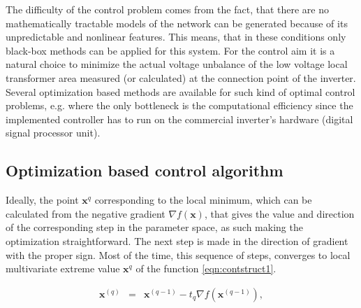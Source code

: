     The difficulty of the control problem comes from the fact, that there are no mathematically tractable models of the network can be generated because of its unpredictable and nonlinear features. This means, that in these conditions only black-box methods can be applied for this system.
    For the control aim it is a natural choice to minimize the actual voltage unbalance of the low voltage local transformer area measured (or calculated) at the connection point of the inverter. Several optimization based methods are available for such kind of optimal control problems, e.g. \cite{gorbe2012reduction} where the only bottleneck is the computational efficiency since the implemented controller has to run on the commercial inverter's hardware (digital signal processor unit).

    \subsection{Optimization based control algorithm}\label{VUB:sec:Optimization}

        Ideally, the point $\textbf{x}^q$ corresponding to the local minimum, which can be calculated from the negative gradient $\nabla f(\textbf{x})$, that gives the value and direction of the corresponding step in the parameter space, as such making the optimization straightforward. The next step is made in the direction of gradient with the proper sign. Most of the time, this sequence of steps, converges to local multivariate extreme value $\textbf{x}^q$ of the function \ref{eqn:contstruct1}.

        \begin{equation}
        \begin{array}{rcl}
        \label{eqn:contstruct1}
         \textbf{x}^{(q)}&=&\textbf{x}^{(q-1)}-t_q\nabla f(\textbf{x}^{(q-1)}),\\
         \end{array}
        \end{equation}

